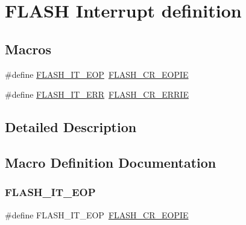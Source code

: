 \hypertarget{group___f_l_a_s_h___interrupt__definition}{}\section{F\+L\+A\+SH Interrupt definition}
\label{group___f_l_a_s_h___interrupt__definition}
\subsection*{Macros}
\begin{DoxyCompactItemize}
\item 
\#define \hyperlink{group___f_l_a_s_h___interrupt__definition_gaea20e80e1806d58a7544cfe8659e7f11}{F\+L\+A\+S\+H\+\_\+\+I\+T\+\_\+\+E\+OP}~\hyperlink{group___peripheral___registers___bits___definition_gab9e69856f654ec430a42791a34799db0}{F\+L\+A\+S\+H\+\_\+\+C\+R\+\_\+\+E\+O\+P\+IE}
\item 
\#define \hyperlink{group___f_l_a_s_h___interrupt__definition_ga4e2c23ab8c1b9a5ee49bf6d695d9ae8c}{F\+L\+A\+S\+H\+\_\+\+I\+T\+\_\+\+E\+RR}~\hyperlink{group___peripheral___registers___bits___definition_ga930897cecdaa9dbef8c640b84acbd8c2}{F\+L\+A\+S\+H\+\_\+\+C\+R\+\_\+\+E\+R\+R\+IE}
\end{DoxyCompactItemize}


\subsection{Detailed Description}


\subsection{Macro Definition Documentation}
\mbox{\label{group___f_l_a_s_h___interrupt__definition_gaea20e80e1806d58a7544cfe8659e7f11}} 
\subsubsection{\texorpdfstring{F\+L\+A\+S\+H\+\_\+\+I\+T\+\_\+\+E\+OP}{FLASH\_IT\_EOP}}
{\footnotesize\ttfamily \#define F\+L\+A\+S\+H\+\_\+\+I\+T\+\_\+\+E\+OP~\hyperlink{group___peripheral___registers___bits___definition_gab9e69856f654ec430a42791a34799db0}{F\+L\+A\+S\+H\+\_\+\+C\+R\+\_\+\+E\+O\+P\+IE}}

